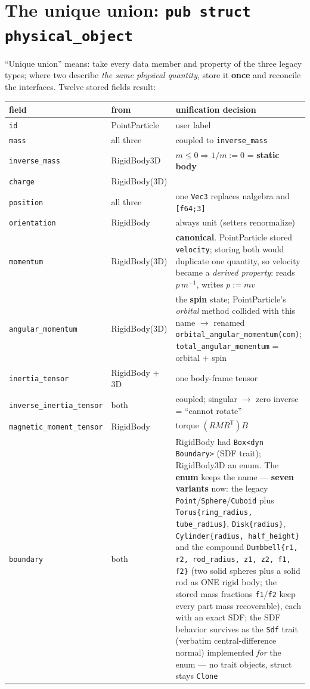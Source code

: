 \documentclass[11pt]{article}
\newcommand{\code}[1]{\texttt{#1}}
\begin{document}
\section{The unique union: \code{pub struct physical\_object}}\label{sec:union}

``Unique union'' means: take every data member and property of the
three legacy types; where two describe \emph{the same physical
quantity}, store it \textbf{once} and reconcile the interfaces. Twelve
stored fields result:

\begin{longtable}{llp{8.2cm}}
\textbf{field} & \textbf{from} & \textbf{unification decision}\\\hline
\code{id} & PointParticle & user label\\
\code{mass} & all three & coupled to \code{inverse\_mass}\\
\code{inverse\_mass} & RigidBody3D & $m\le 0 \Rightarrow 1/m := 0$ = \textbf{static body}\\
\code{charge} & RigidBody(3D) & \\
\code{position} & all three & one \code{Vec3} replaces nalgebra and \code{[f64;3]}\\
\code{orientation} & RigidBody & always unit (setters renormalize)\\
\code{momentum} & RigidBody(3D) & \textbf{canonical}. PointParticle stored \code{velocity}; storing both would duplicate one quantity, so velocity became a \emph{derived property}: reads $p\,m^{-1}$, writes $p := m v$\\
\code{angular\_momentum} & RigidBody(3D) & the \textbf{spin} state; PointParticle's \emph{orbital} method collided with this name $\to$ renamed \code{orbital\_angular\_momentum(com)}; \code{total\_angular\_momentum} = orbital + spin\\
\code{inertia\_tensor} & RigidBody + 3D & one body-frame tensor\\
\code{inverse\_inertia\_tensor} & both & coupled; singular $\to$ zero inverse = ``cannot rotate''\\
\code{magnetic\_moment\_tensor} & RigidBody & torque $(RMR^{\mathsf T})B$\\
\code{boundary} & both & RigidBody had \code{Box<dyn Boundary>} (SDF trait); RigidBody3D an enum. The \textbf{enum} keeps the name --- \textbf{seven variants} now: the legacy \code{Point}/\code{Sphere}/\code{Cuboid} plus \code{Torus\{ring\_radius, tube\_radius\}}, \code{Disk\{radius\}}, \code{Cylinder\{radius, half\_height\}} and the compound \code{Dumbbell\{r1, r2, rod\_radius, z1, z2, f1, f2\}} (two solid spheres plus a solid rod as ONE rigid body; the stored mass fractions \code{f1}/\code{f2} keep every part mass recoverable), each with an exact SDF; the SDF behavior survives as the \code{Sdf} trait (verbatim central-difference normal) implemented \emph{for} the enum --- no trait objects, struct stays \code{Clone}\\
\end{longtable}
\end{document}
